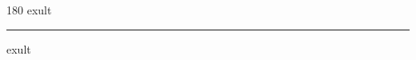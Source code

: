 
\begin{frame}
\begin{center}
\begin{turn}{180}
{\fontsize{2.5cm}{1em}\selectfont exult}
\end{turn}
\vspace{1em}\par  
\hrule
\vspace{1em}\par  
{\fontsize{2.5cm}{1em}\selectfont exult}
\end{center}
\end{frame}
